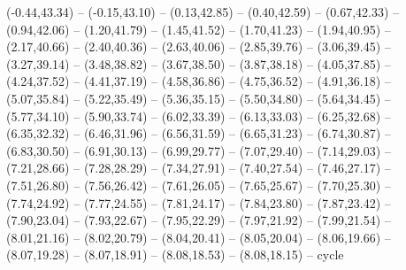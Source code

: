 {  (-0.44,43.34) -- (-0.15,43.10) -- (0.13,42.85) -- (0.40,42.59) -- (0.67,42.33) -- (0.94,42.06) -- (1.20,41.79) --
  (1.45,41.52) -- (1.70,41.23) -- (1.94,40.95) -- (2.17,40.66) -- (2.40,40.36) -- (2.63,40.06) -- (2.85,39.76) --
  (3.06,39.45) -- (3.27,39.14) -- (3.48,38.82) -- (3.67,38.50) -- (3.87,38.18) -- (4.05,37.85) -- (4.24,37.52) --
  (4.41,37.19) -- (4.58,36.86) -- (4.75,36.52) -- (4.91,36.18) -- (5.07,35.84) -- (5.22,35.49) -- (5.36,35.15) --
  (5.50,34.80) -- (5.64,34.45) -- (5.77,34.10) -- (5.90,33.74) -- (6.02,33.39) -- (6.13,33.03) -- (6.25,32.68) --
  (6.35,32.32) -- (6.46,31.96) -- (6.56,31.59) -- (6.65,31.23) -- (6.74,30.87) -- (6.83,30.50) -- (6.91,30.13) --
  (6.99,29.77) -- (7.07,29.40) -- (7.14,29.03) -- (7.21,28.66) -- (7.28,28.29) -- (7.34,27.91) -- (7.40,27.54) --
  (7.46,27.17) -- (7.51,26.80) -- (7.56,26.42) -- (7.61,26.05) -- (7.65,25.67) -- (7.70,25.30) -- (7.74,24.92) --
  (7.77,24.55) -- (7.81,24.17) -- (7.84,23.80) -- (7.87,23.42) -- (7.90,23.04) -- (7.93,22.67) -- (7.95,22.29) --
  (7.97,21.92) -- (7.99,21.54) -- (8.01,21.16) -- (8.02,20.79) -- (8.04,20.41) -- (8.05,20.04) -- (8.06,19.66) --
  (8.07,19.28) -- (8.07,18.91) -- (8.08,18.53) -- (8.08,18.15) -- cycle}
